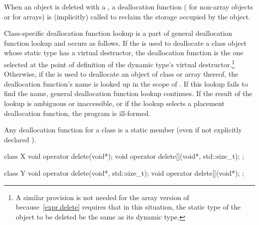 \pnum
{}%
When an object is deleted with a
,
a deallocation function
%
(
%
for non-array objects or
%
for arrays) is (implicitly) called to reclaim the storage occupied by
the object.

\pnum
Class-specific deallocation function lookup is a part of general deallocation
function lookup and occurs as follows.
If the 
is used to deallocate a class object whose static type has a virtual
destructor, the deallocation function is the one selected at the point
of definition of the dynamic type's virtual
destructor.\footnote{A similar provision is not needed for
the array version of   because~\ref{expr.delete}
requires that in this situation, the static type of the object to be deleted be
the same as its dynamic type.
}
Otherwise, if the
is used to deallocate an object of class
or array thereof,
the deallocation function's name is looked up in the scope of
.
If this lookup fails to find the name, general deallocation function
lookup continues.
If the result of the lookup is ambiguous or inaccessible, or if the lookup
selects a placement deallocation function, the program is ill-formed.

\pnum
{}%
Any deallocation function for a class
is a static member (even if not explicitly declared
).
\begin{example}
\begin{codeblock}
class X {
  void operator delete(void*);
  void operator delete[](void*, std::size_t);
};

class Y {
  void operator delete(void*, std::size_t);
  void operator delete[](void*);
};
\end{codeblock}
\end{example}

